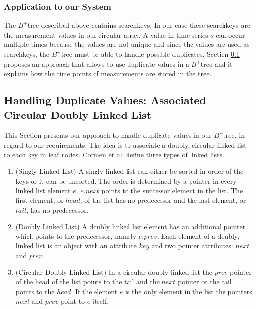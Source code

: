 \documentclass[abstracton,12pt,oneside]{scrreprt}
\begin{document}
\subsubsection{Application to our System}
The $B^+$tree described above contains searchkeys. In our case these searchkeys are the measurement values in our circular array. A value in time series $s$ can occur multiple times because the values are not unique and since the values are used as searchkeys, the $B^+$tree must be able to handle possible duplicates. Section \ref{sec:allowDV} proposes an approach that allows to use duplicate values in a $B^+$tree and it explains how the time points of measurements are stored in the tree. 



\subsection{Handling Duplicate Values: Associated Circular Doubly Linked List}
\label{sec:allowDV}
This Section presents our approach to handle duplicate values in our $B^+$tree, in regard to our requirements. 
\label{doublyLinked}
The idea is to associate a doubly, circular linked list to each key in leaf nodes. Cormen et al.\cite{LinkedListBook} define three types of linked lists.
\begin{enumerate}
	\item (Singly Linked List) A singly linked list can either be sorted in order of the keys or it can be unsorted. The order is determined by a pointer in every linked list element $e$. $e.next$ points to the successor element in the list. The first element, or $head$, of the list has no predecessor and the last element, or $tail$, has no predecessor. 
	\item (Doubly Linked List) A doubly linked list element has an additional pointer which points to the predecessor, namely $e.prev$. Each element of a doubly, linked list is an object with an attribute $key$ and two pointer attributes: $next$ and $prev$.
	\item (Circular Doubly Linked List) In a circular doubly linked list the $prev$ pointer of the head of the list points to the tail and the $next$ pointer ot the tail points to the $head$. If the element $e$ is the only element in the list the pointers $next$ and $prev$ point to $e$ itself. 
\end{enumerate}
\end{document}
